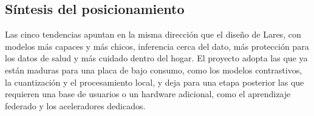 \subsection{Síntesis del posicionamiento}

Las cinco tendencias apuntan en la misma dirección que el diseño de Lares, con modelos más capaces y más chicos, inferencia cerca del dato, más protección para los datos de salud y más cuidado dentro del hogar.
El proyecto adopta las que ya están maduras para una placa de bajo consumo, como los modelos contrastivos, la cuantización y el procesamiento local, y deja para una etapa posterior las que requieren una base de usuarios o un hardware adicional, como el aprendizaje federado y los aceleradores dedicados.
